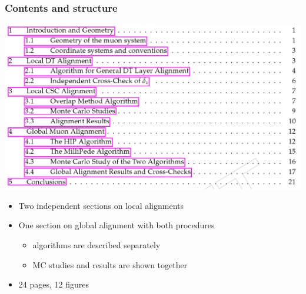 \documentclass[compress]{beamer}
\begin{document}
\begin{frame}
\frametitle{Contents and structure}

\vspace{0.25 cm}
\includegraphics[width=0.9\linewidth]{contents.png}

\begin{itemize}
\item Two independent sections on local alignments
\item One section on global alignment with both procedures
\begin{itemize}
\item algorithms are described separately
\item MC studies and results are shown together
\end{itemize}
\item 24 pages, 12 figures
\end{itemize}

\end{frame}
\end{document}
